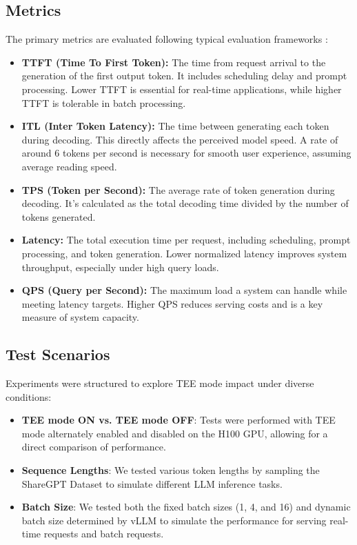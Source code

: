 \documentclass{article}
\begin{document}
\subsection{Metrics}

The primary metrics are evaluated following typical evaluation frameworks \cite{agrawal2024metron}:

\begin{itemize}
    \item \textbf{TTFT (Time To First Token):} The time from request arrival to the generation of the first output token. It includes scheduling delay and prompt processing. Lower TTFT is essential for real-time applications, while higher TTFT is tolerable in batch processing.

    \item \textbf{ITL (Inter Token Latency):} The time between generating each token during decoding. This directly affects the perceived model speed. A rate of around 6 tokens per second is necessary for smooth user experience, assuming average reading speed.

    \item \textbf{TPS (Token per Second):} The average rate of token generation during decoding. It's calculated as the total decoding time divided by the number of tokens generated.

    \item \textbf{Latency:} The total execution time per request, including scheduling, prompt processing, and token generation. Lower normalized latency improves system throughput, especially under high query loads.

    \item \textbf{QPS (Query per Second):} The maximum load a system can handle while meeting latency targets. Higher QPS reduces serving costs and is a key measure of system capacity.
\end{itemize}


\subsection{Test Scenarios}

Experiments were structured to explore TEE mode impact under diverse conditions:
\begin{itemize}
    \item \textbf{TEE mode ON vs. TEE mode OFF}: Tests were performed with TEE mode alternately enabled and disabled on the H100 GPU, allowing for a direct comparison of performance.
    \item \textbf{Sequence Lengths}: We tested various token lengths by sampling the ShareGPT Dataset \cite{sharegpt} to simulate different LLM inference tasks.
    \item \textbf{Batch Size}: We tested both the fixed batch sizes (1, 4, and 16) and dynamic batch size determined by vLLM \cite{kwon2023efficient} to simulate the performance for serving real-time requests and batch requests.
\end{itemize}
\end{document}
